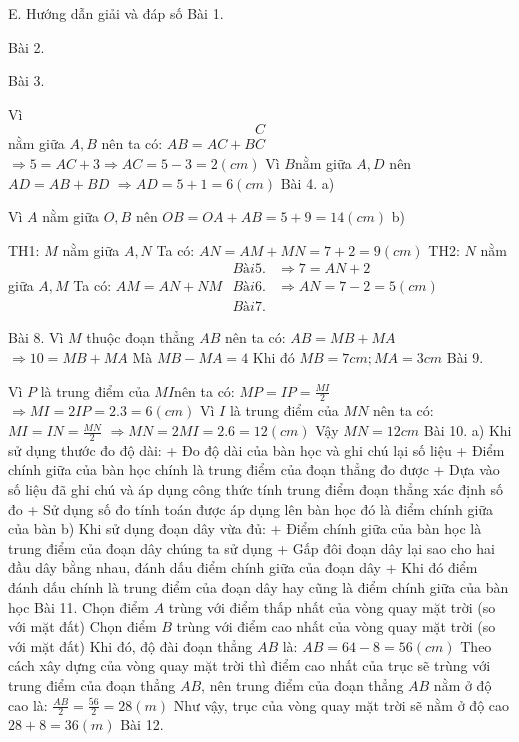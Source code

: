 E. Hướng dẫn giải và đáp số
Bài 1. 



Bài 2. 



Bài 3. 

Vì \[C\]nằm giữa $A,B$ nên ta có: $AB=AC+BC$
$\Rightarrow 5=AC+3\Rightarrow AC=5-3=2\left( cm \right)$
Vì $B$nằm giữa $A,D$ nên $AD=AB+BD$
$\Rightarrow AD=5+1=6\left( cm \right)$
Bài 4. 
a) 

Vì $A$ nằm giữa $O,B$ nên $OB=OA+AB=5+9=14\left( cm \right)$
b)

TH1: $M$ nằm giữa $A,N$
Ta có: $AN=AM+MN=7+2=9\left( cm \right)$
TH2: $N$ nằm giữa $A,M$
Ta có: $AM=AN+NM$
$\begin{align}
	Bài 5.   & \Rightarrow 7=AN+2 \\ 
	Bài 6.  & \Rightarrow AN=7-2=5\left( cm \right) \\ 
	Bài 7. \end{align}$


Bài 8. 
Vì $M$ thuộc đoạn thẳng $AB$ nên ta có: $AB=MB+MA$
$\Rightarrow 10=MB+MA$
Mà $MB-MA=4$
Khi đó $MB=7cm;MA=3cm$
Bài 9. 


Vì $P$ là trung điểm của $MI$nên ta có: $MP=IP=\frac{MI}{2}$
$\Rightarrow MI=2IP=2.3=6\left( cm \right)$
Vì $I$ là trung điểm của $MN$ nên ta có: $MI=IN=\frac{MN}{2}$
$\Rightarrow MN=2MI=2.6=12\left( cm \right)$
Vậy $MN=12cm$
Bài 10. 
a) Khi sử dụng thước đo độ dài:
+ Đo độ dài của bàn học và ghi chú lại số liệu
+ Điểm chính giữa của bàn học chính là trung điểm của đoạn thẳng đo được
+ Dựa vào số liệu đã ghi chú và áp dụng công thức tính trung điểm đoạn thẳng xác định số đo
+ Sử dụng số đo tính toán được áp dụng lên bàn học đó là điểm chính giữa của bàn
b) Khi sử dụng đoạn dây vừa đủ:
+ Điểm chính giữa của bàn học là trung điểm của đoạn dây chúng ta sử dụng
+ Gấp đôi đoạn dây lại sao cho hai đầu dây bằng nhau, đánh dấu điểm chính giữa của đoạn dây
+ Khi đó điểm đánh dấu chính là trung điểm của đoạn dây hay cũng là điểm chính giữa của bàn học
Bài 11. 
Chọn điểm $A$ trùng với điểm thấp nhất của vòng quay mặt trời (so với mặt đất)
Chọn điểm $B$ trùng với điểm cao nhất của vòng quay mặt trời (so với mặt đất)
Khi đó, độ đài đoạn thẳng $AB$ là: $AB=64-8=56\left( cm \right)$
Theo cách xây dựng của vòng quay mặt trời thì điểm cao nhất của trục sẽ trùng với trung điểm của đoạn thẳng $AB$, nên trung điểm của đoạn thẳng $AB$ nằm ở độ cao là: $\frac{AB}{2}=\frac{56}{2}=28\left( m \right)$
Như vậy, trục của vòng quay mặt trời sẽ nằm ở độ cao $28+8=36\left( m \right)$
Bài 12. 

